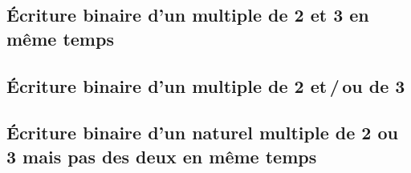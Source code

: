 \subsection{Écriture binaire d'un multiple de 2 et 3 en même temps}

	


\newpage
\subsection{Écriture binaire d'un multiple de 2 et\,/\,ou de 3}

	



\newpage
\subsection{Écriture binaire d'un naturel multiple de 2 ou 3 mais pas des deux en même temps}

	
